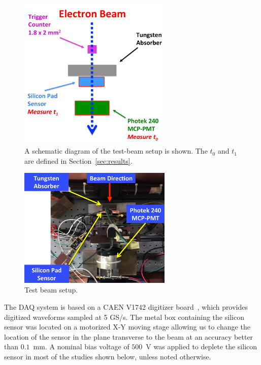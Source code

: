 \begin{figure}[h] 
\centering
\includegraphics[width=0.65\textwidth]{plots/BeamSchematicDiagram.pdf} 
\caption{A schematic diagram of the test-beam setup is shown. The $t_0$ and $t_1$ are defined in Section~\ref{sec:results}.} 
\label{fig:BeamSchematicDiagram} 
\end{figure} 

\begin{figure}[h] 
\centering
\includegraphics[width=0.65\textwidth]{plots/BeamPhotoDiagram.pdf} 
\caption{Test beam setup.} 
\label{fig:BeamPhotoDiagram} 
\end{figure} 

The DAQ system is based on a CAEN V1742 digitizer board~\cite{CAENDRS}, which
provides digitized waveforms sampled at 5 GS/s. The metal box containing the
silicon sensor was located on a motorized X-Y moving stage allowing us to change
the location of the sensor in the plane transverse to the beam at an accuracy
better than $0.1$~mm. A nominal bias voltage of $500$~V was applied to deplete
the silicon sensor in most of the studies shown below, unless noted otherwise.



